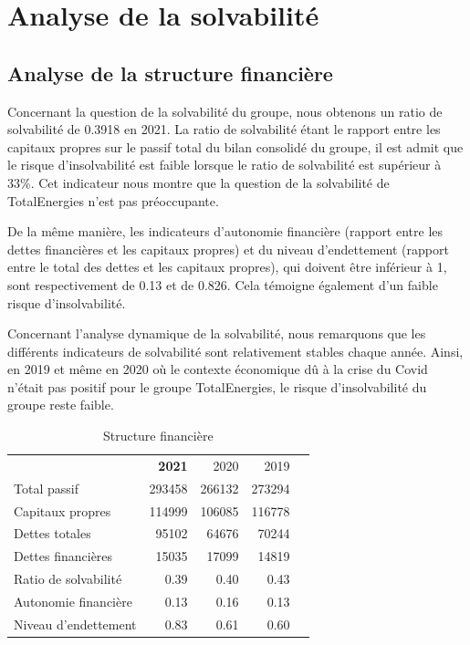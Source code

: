\documentclass[12pt]{article}
\begin{document}
\section{Analyse de la solvabilité}
\subsection{Analyse de la structure financière}
Concernant la question de la solvabilité du groupe, nous obtenons un ratio de 
solvabilité de 0.3918 en 2021.
La ratio de solvabilité étant le rapport entre les capitaux propres sur le passif total du bilan 
consolidé du groupe, il est admit que le risque d'insolvabilité est faible lorsque le ratio de 
solvabilité est supérieur à 33\%. Cet indicateur nous montre que la question de la solvabilité de TotalEnergies n'est pas préoccupante.


De la même manière, les indicateurs d'autonomie financière (rapport entre les dettes financières et
les capitaux propres) et du niveau d'endettement (rapport entre le total des dettes et les capitaux 
propres), qui doivent être inférieur à 1, sont respectivement de 0.13 et de 0.826.
Cela témoigne également d'un faible risque d'insolvabilité.

Concernant l'analyse dynamique de la solvabilité, nous remarquons que les différents indicateurs de 
solvabilité sont relativement stables chaque année. Ainsi, en 2019 et même en 2020 où le contexte 
économique dû à la crise du Covid n'était pas positif pour le groupe TotalEnergies, le risque 
d'insolvabilité du groupe reste faible.
\begin{table}[H]
    \sffamily
    \centering
    \caption{Structure financière}
    \label{table:solva}
    \begin{tabular}{l*{1}{rrrr}}
    \toprule
~&\textbf{2021} & 2020 & 2019 \\ 
\cmidrule(r){1-1}\cmidrule(r){2-4}
Total passif & 293458 & 266132 & 273294 \\ 
Capitaux propres & 114999 & 106085 & 116778 \\ 
Dettes totales & 95102 & 64676 & 70244 \\ 
Dettes financières & 15035 & 17099 & 14819 \\ 
\cmidrule(r){1-1}\cmidrule(r){2-4}
Ratio de solvabilité & 0.39 & 0.40 & 0.43 \\ 
Autonomie financière & 0.13 & 0.16 & 0.13 \\ 
Niveau d'endettement & 0.83 & 0.61 & 0.60 \\ 
\bottomrule
\end{tabular}
\end{table}
\end{document}
